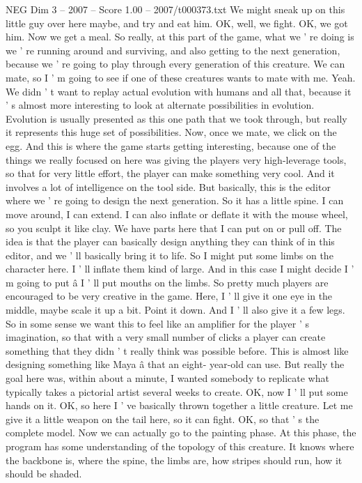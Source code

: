\begin{textsample}{NEG Dim 3 – 2007 – Score 1.00 – 2007/t000373.txt}
We might sneak up on this little guy over here maybe, and try and eat him.
OK, well, we fight.
OK, we got him.
Now we get a meal.
So really, at this part of the game, what we ' re doing is we ' re running around and surviving, and also getting to the next generation, because we ' re going to play through every generation of this creature.
We can mate, so I ' m going to see if one of these creatures wants to mate with me.
Yeah.
We didn ' t want to replay actual evolution with humans and all that, because it ' s almost more interesting to look at alternate possibilities in evolution.
Evolution is usually presented as this one path that we took through, but really it represents this huge set of possibilities.
Now, once we mate, we click on the egg.
And this is where the game starts getting interesting, because one of the things we really focused on here was giving the players very high-leverage tools, so that for very little effort, the player can make something very cool.
And it involves a lot of intelligence on the tool side.
But basically, this is the editor where we ' re going to design the next generation.
So it has a little spine.
I can move around, I can extend.
I can also inflate or deflate it with the mouse wheel, so you sculpt it like clay.
We have parts here that I can put on or pull off.
The idea is that the player can basically design anything they can think of in this editor, and we ' ll basically bring it to life.
So I might put some limbs on the character here.
I ' ll inflate them kind of large.
And in this case I might decide I ' m going to put â I ' ll put mouths on the limbs.
So pretty much players are encouraged to be very creative in the game.
Here, I ' ll give it one eye in the middle, maybe scale it up a bit.
Point it down.
And I ' ll also give it a few legs.
So in some sense we want this to feel like an amplifier for the player ' s imagination, so that with a very small number of clicks a player can create something that they didn ' t really think was possible before.
This is almost like designing something like Maya â that an eight- year-old can use.
But really the goal here was, within about a minute, I wanted somebody to replicate what typically takes a pictorial artist several weeks to create.
OK, now I ' ll put some hands on it.
OK, so here I ' ve basically thrown together a little creature.
Let me give it a little weapon on the tail here, so it can fight.
OK, so that ' s the complete model.
Now we can actually go to the painting phase.
At this phase, the program has some understanding of the topology of this creature.
It knows where the backbone is, where the spine, the limbs are, how stripes should run, how it should be shaded.

\end{textsample}
